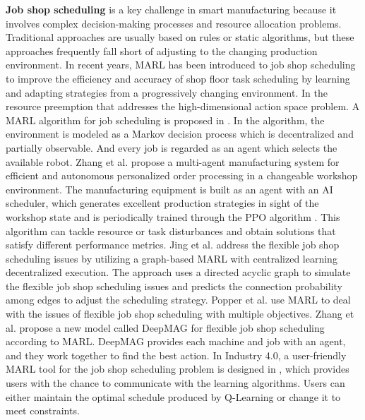 \documentclass[acmsmall]{acmart}
\begin{document}
\textbf{Job shop scheduling} is a key challenge in smart manufacturing because it involves complex decision-making processes and resource allocation problems. Traditional approaches are usually based on rules or static algorithms, but these approaches frequently fall short of adjusting to the changing production environment. In recent years, MARL has been introduced to job shop scheduling to improve the efficiency and accuracy of shop floor task scheduling by learning and adapting strategies from a progressively changing environment.
In the resource preemption that addresses the high-dimensional action space problem. A MARL algorithm for job scheduling is proposed in \cite{WANG2022102324}. In the algorithm, the environment is modeled as a Markov decision process which is decentralized and partially observable. And every job is regarded as an agent which selects the available robot. 
Zhang et al. \cite{ZHANG2022102412} propose a multi-agent manufacturing system for efficient and autonomous personalized order processing in a changeable workshop environment. The manufacturing equipment is built as an agent with an AI scheduler, which generates excellent production strategies in sight of the workshop state and is periodically trained through the PPO algorithm \cite{ppo}. This algorithm can tackle resource or task disturbances and obtain solutions that satisfy different performance metrics.
Jing et al. \cite{Jing2022} address the flexible job shop scheduling issues by utilizing a graph-based MARL with centralized learning decentralized execution. The approach uses a directed acyclic graph to simulate the flexible job shop scheduling issues and predicts the connection probability among edges to adjust the scheduling strategy.
Popper et al. \cite{POPPER202263,9590925} use MARL to deal with the issues of flexible job shop scheduling with multiple objectives.
Zhang et al. \cite{ZHANG2023110083} propose a new model called DeepMAG for flexible job shop scheduling according to MARL. DeepMAG provides each machine and job with an agent, and they work together to find the best action.
In Industry 4.0, a user-friendly MARL tool for the job shop scheduling problem is designed in \cite{10.1007/978-3-030-41913-4_1}, which provides users with the chance to communicate with the learning algorithms. Users can either maintain the optimal schedule produced by Q-Learning or change it to meet constraints.
\end{document}
